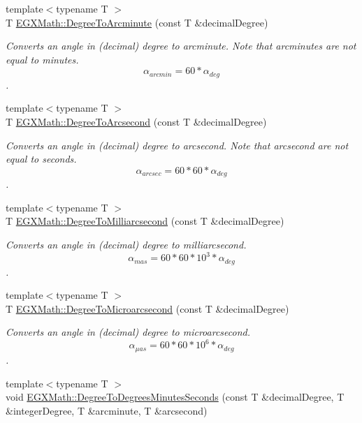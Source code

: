 \begin{DoxyCompactItemize}
{\footnotesize template$<$typename T $>$ }\\T \mbox{\hyperlink{group___e_g_x_math-_angle_conversions-_degree_ga8abf327dc5f52907b2c881999e9cc43e}{E\+G\+X\+Math\+::\+Degree\+To\+Arcminute}} (const T \&decimal\+Degree)
\begin{DoxyCompactList}\small\item\em Converts an angle in (decimal) degree to arcminute. Note that arcminutes are not equal to minutes. \[\alpha_{arcmin}= 60 * \alpha_{deg}\]. \end{DoxyCompactList}\item 
{\footnotesize template$<$typename T $>$ }\\T \mbox{\hyperlink{group___e_g_x_math-_angle_conversions-_degree_gaf85e2d765c248f447854a807a68a5de8}{E\+G\+X\+Math\+::\+Degree\+To\+Arcsecond}} (const T \&decimal\+Degree)
\begin{DoxyCompactList}\small\item\em Converts an angle in (decimal) degree to arcsecond. Note that arcsecond are not equal to seconds. \[\alpha_{arcsec}=60 * 60 * \alpha_{deg}\]. \end{DoxyCompactList}\item 
{\footnotesize template$<$typename T $>$ }\\T \mbox{\hyperlink{group___e_g_x_math-_angle_conversions-_degree_ga2c218e286b2ef72a00734dbc5a7f5ab6}{E\+G\+X\+Math\+::\+Degree\+To\+Milliarcsecond}} (const T \&decimal\+Degree)
\begin{DoxyCompactList}\small\item\em Converts an angle in (decimal) degree to milliarcsecond. \[\alpha_{mas}=60 * 60 * 10^3 * \alpha_{deg} \]. \end{DoxyCompactList}\item 
{\footnotesize template$<$typename T $>$ }\\T \mbox{\hyperlink{group___e_g_x_math-_angle_conversions-_degree_ga31b65388fe1b4656663b3d66b9d764e6}{E\+G\+X\+Math\+::\+Degree\+To\+Microarcsecond}} (const T \&decimal\+Degree)
\begin{DoxyCompactList}\small\item\em Converts an angle in (decimal) degree to microarcsecond. \[\alpha_{\mu as}=60 * 60 * 10^6 * \alpha_{deg}\]. \end{DoxyCompactList}\item 
{\footnotesize template$<$typename T $>$ }\\void \mbox{\hyperlink{group___e_g_x_math-_angle_conversions-_degree_ga859585939255d52d010c780c68eb6e23}{E\+G\+X\+Math\+::\+Degree\+To\+Degrees\+Minutes\+Seconds}} (const T \&decimal\+Degree, T \&integer\+Degree, T \&arcminute, T \&arcsecond)

\end{DoxyCompactItemize}
